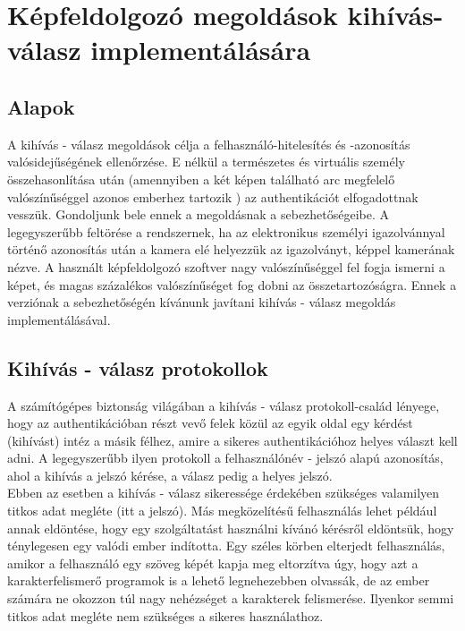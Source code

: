 \section{Képfeldolgozó megoldások kihívás-válasz implementálására}
\subsection{Alapok}
A kihívás - válasz megoldások célja a felhasználó-hitelesítés és -azonosítás valósidejűségének ellenőrzése. E nélkül a természetes és virtuális személy összehasonlítása után (amennyiben a két képen található arc megfelelő valószínűséggel azonos emberhez tartozik )  az authentikációt elfogadottnak vesszük.
Gondoljunk bele ennek a megoldásnak a sebezhetőségeibe. A legegyszerűbb feltörése a rendszernek, ha az elektronikus személyi igazolvánnyal történő azonosítás után a kamera elé helyezzük az igazolványt, képpel kamerának nézve. A használt képfeldolgozó szoftver nagy valószínűséggel fel fogja ismerni a képet, és magas százalékos valószínűséget fog dobni az összetartozóságra. Ennek a verziónak a sebezhetőségén kívánunk javítani kihívás - válasz megoldás implementálásával.
\subsection{Kihívás - válasz protokollok}
A számítógépes biztonság világában a kihívás - válasz protokoll-család lényege, hogy az authentikációban részt vevő felek közül az egyik oldal egy kérdést (kihívást) intéz a másik félhez, amire a sikeres authentikációhoz helyes választ kell adni. A legegyszerűbb ilyen protokoll a felhasználónév - jelszó alapú azonosítás, ahol a kihívás a jelszó kérése, a válasz pedig a helyes jelszó.
\\Ebben az esetben a  kihívás - válasz sikeressége érdekében szükséges valamilyen titkos adat megléte (itt a jelszó). Más megközelítésű felhasználás lehet például annak eldöntése, hogy egy szolgáltatást használni kívánó kérésről eldöntsük, hogy ténylegesen egy valódi ember indította. Egy széles körben elterjedt felhasználás, amikor a felhasználó egy szöveg képét kapja meg eltorzítva úgy, hogy azt a karakterfelismerő programok is a lehető legnehezebben olvassák, de az ember számára ne okozzon túl nagy nehézséget a karakterek felismerése. Ilyenkor semmi titkos adat megléte nem szükséges a sikeres használathoz.
